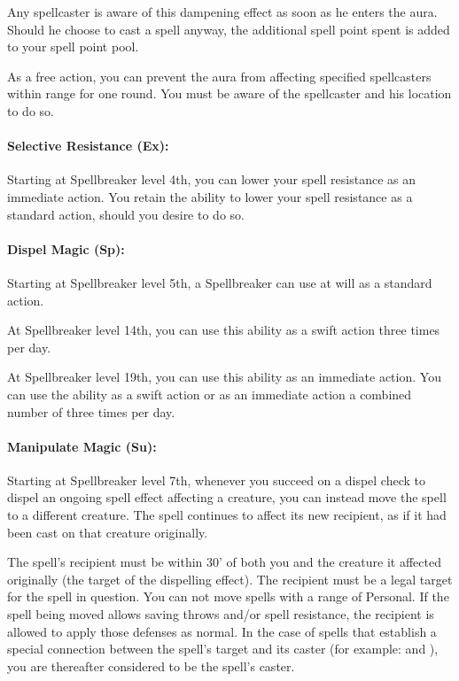 Any spellcaster is aware of this dampening effect as soon as he enters the aura. Should he choose to cast a spell anyway, the additional spell point spent is added to your spell point pool.

As a free action, you can prevent the aura from affecting specified spellcasters within range for one round. You must be aware of the spellcaster and his location to do so.
\paragraph{Selective Resistance (Ex):} Starting at Spellbreaker level 4th, you can lower your spell resistance as an immediate action. You retain the ability to lower your spell resistance as a standard action, should you desire to do so.

\paragraph{Dispel Magic (Sp):} Starting at Spellbreaker level 5th, a Spellbreaker can use  at will as a standard action.

At Spellbreaker level 14th, you can use this ability as a swift action three times per day.

At Spellbreaker level 19th, you can use this ability as an immediate action. You can use the ability as a swift action or as an immediate action a combined number of three times per day.
\paragraph{Manipulate Magic (Su):} Starting at Spellbreaker level 7th, whenever you succeed on a dispel check to dispel an ongoing spell effect affecting a creature, you can instead move the spell to a different creature. The spell continues to affect its new recipient, as if it had been cast on that creature originally.

The spell's recipient must be within 30' of both you and the creature it affected originally (the target of the dispelling effect).
The recipient must be a legal target for the spell in question. You can not move spells with a range of Personal. If the spell being moved allows saving throws and/or spell resistance, the recipient is allowed to apply those defenses as normal. In the case of spells that establish a special connection between the spell's target and its caster (for example:  and ), you are thereafter considered to be the spell's caster.

